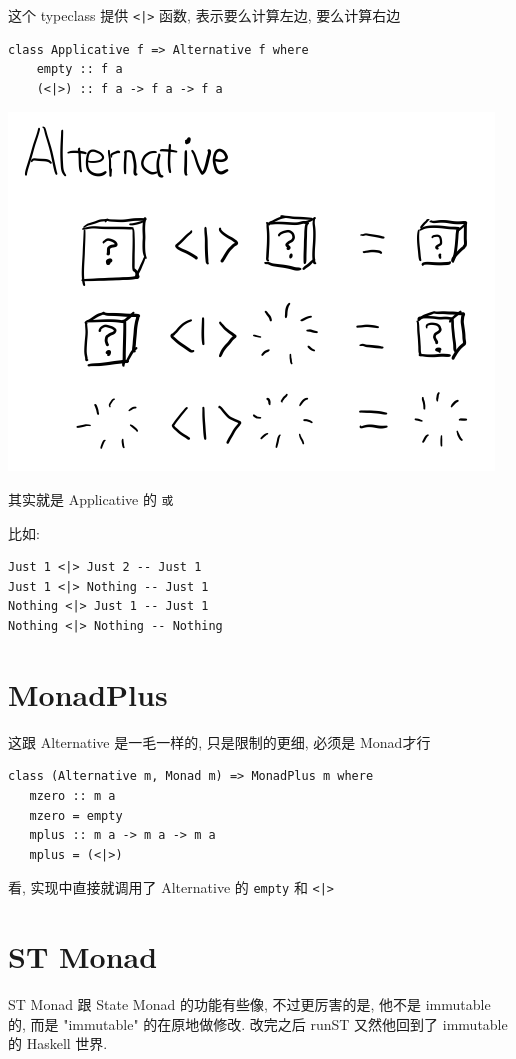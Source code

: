 \documentclass[11pt]{tufte-book}
\begin{document}
这个 typeclass 提供 \texttt{<|>} 函数, 表示要么计算左边, 要么计算右边

\begin{verbatim}
class Applicative f => Alternative f where
    empty :: f a
    (<|>) :: f a -> f a -> f a
\end{verbatim}

\begin{center}
\includegraphics[width=.9\linewidth]{images/p3-Alternative.png}
\end{center}

其实就是 Applicative 的 \texttt{或}

比如:
\begin{verbatim}
Just 1 <|> Just 2 -- Just 1
Just 1 <|> Nothing -- Just 1
Nothing <|> Just 1 -- Just 1
Nothing <|> Nothing -- Nothing
\end{verbatim}

\chapter{MonadPlus}
\label{sec:org86c6154}
这跟 Alternative 是一毛一样的, 只是限制的更细, 必须是 Monad才行

\begin{verbatim}
class (Alternative m, Monad m) => MonadPlus m where
   mzero :: m a
   mzero = empty
   mplus :: m a -> m a -> m a
   mplus = (<|>)
\end{verbatim}

看, 实现中直接就调用了 Alternative 的 \texttt{empty} 和 \texttt{<|>}

\chapter{ST Monad}
\label{sec:orge3ecca8}
ST Monad 跟 State Monad 的功能有些像, 不过更厉害的是, 他不是 immutable 的, 而是 "immutable" 的在原地做修改. 改完之后 runST 又然他回到了 immutable 的 Haskell 世界.
\end{document}
